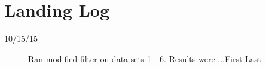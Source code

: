 \section{Landing Log}

\begin{description}
\item [10/15/15]  Ran modified filter on data sets 1 - 6.  Results were ...\hfill{First Last}
\end{description}